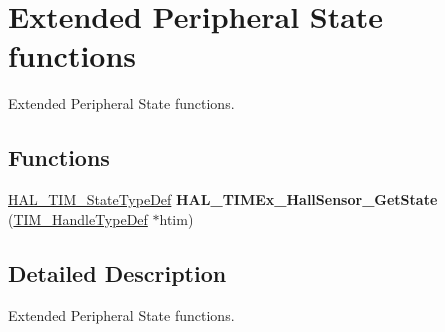 \hypertarget{group___t_i_m_ex___exported___functions___group7}{}\section{Extended Peripheral State functions}
\label{group___t_i_m_ex___exported___functions___group7}


Extended Peripheral State functions.  


\subsection*{Functions}
\begin{DoxyCompactItemize}
\item 
\mbox{\label{group___t_i_m_ex___exported___functions___group7_ga69d56afa939909717370413d35311dbd}} 
\hyperlink{group___t_i_m___exported___types_gae0994cf5970e56ca4903e9151f40010c}{H\+A\+L\+\_\+\+T\+I\+M\+\_\+\+State\+Type\+Def} {\bfseries H\+A\+L\+\_\+\+T\+I\+M\+Ex\+\_\+\+Hall\+Sensor\+\_\+\+Get\+State} (\hyperlink{struct_t_i_m___handle_type_def}{T\+I\+M\+\_\+\+Handle\+Type\+Def} $\ast$htim)
\end{DoxyCompactItemize}


\subsection{Detailed Description}
Extended Peripheral State functions. 

